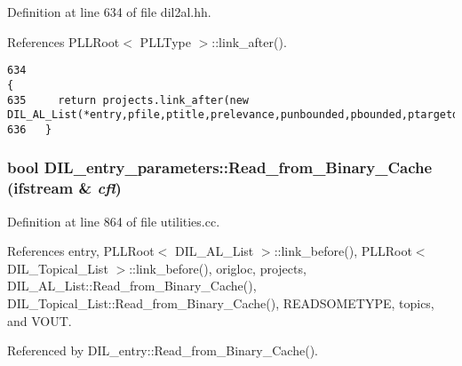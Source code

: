 Definition at line 634 of file dil2al.hh.

References PLLRoot$<$ PLLType $>$::link\_\-after().



\footnotesize\begin{verbatim}634                                                                                                                                                                           {
635     return projects.link_after(new DIL_AL_List(*entry,pfile,ptitle,prelevance,punbounded,pbounded,ptargetdate,ptdprop,purgency,ppriority));
636   }
\end{verbatim}\normalsize 
{}
\subsubsection{\setlength{\rightskip}{0pt plus 5cm}bool DIL\_\-entry\_\-parameters::Read\_\-from\_\-Binary\_\-Cache (ifstream \& {\em cfl})}\label{classDIL__entry__parameters_a7}




Definition at line 864 of file utilities.cc.

References entry, PLLRoot$<$ DIL\_\-AL\_\-List $>$::link\_\-before(), PLLRoot$<$ DIL\_\-Topical\_\-List $>$::link\_\-before(), origloc, projects, DIL\_\-AL\_\-List::Read\_\-from\_\-Binary\_\-Cache(), DIL\_\-Topical\_\-List::Read\_\-from\_\-Binary\_\-Cache(), READSOMETYPE, topics, and VOUT.

Referenced by DIL\_\-entry::Read\_\-from\_\-Binary\_\-Cache().



